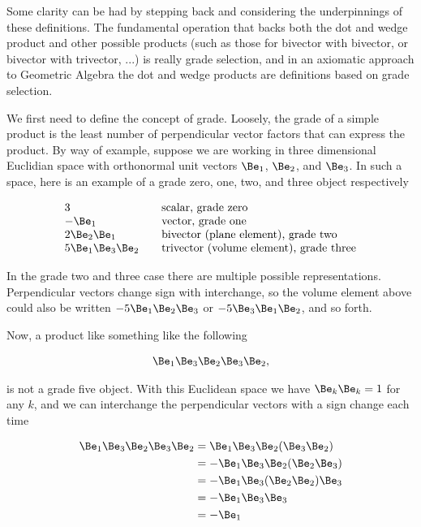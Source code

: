 Some clarity can be had by stepping back and considering the underpinnings of these definitions.  The fundamental operation that backs both the dot and wedge product and other possible products (such as those for bivector with bivector, or bivector with trivector, ...) is really grade selection, and in an
axiomatic approach to Geometric Algebra the dot and wedge products are definitions based on grade selection.

We first need to define the concept of grade.  Loosely, the grade of a simple product is the least number of perpendicular vector factors that can express the product.  By way of example, suppose we are working in three dimensional Euclidian space with orthonormal unit vectors $\Be_1$, $\Be_2$, and $\Be_3$.  In such a space, here is an example of a grade zero, one, two, and three object respectively

\begin{align*}
\begin{array}{l l}
3 & \quad \text{scalar, grade zero} \\
-\Be_1 & \quad \text{vector, grade one} \\
2 \Be_2 \Be_1 & \quad \text{bivector (plane element), grade two} \\
5 \Be_1 \Be_3 \Be_2 & \quad \text{trivector (volume element), grade three} \\
\end{array}
\end{align*}

In the grade two and three case there are multiple possible representations.  Perpendicular vectors change sign with interchange, so the volume element above could also be written $-5 \Be_1 \Be_2 \Be_3$ or $-5 \Be_3 \Be_1 \Be_2$, and so forth.

Now, a product like something like the following

\begin{align*}
\Be_1 \Be_3 \Be_2 \Be_3 \Be_2,
\end{align*}

is not a grade five object.  With this Euclidean space we have $\Be_k\Be_k = 1$ for any $k$, and we can interchange the perpendicular vectors with a sign change each time

\begin{align*}
\Be_1 \Be_3 \Be_2 \Be_3 \Be_2
&=
\Be_1 \Be_3 \Be_2 (\Be_3 \Be_2) \\
&=
-\Be_1 \Be_3 \Be_2 (\Be_2 \Be_3) \\
&=
-\Be_1 \Be_3 (\Be_2 \Be_2) \Be_3 \\
&=
-\Be_1 \Be_3 \Be_3 \\
&=
-\Be_1
\end{align*}

